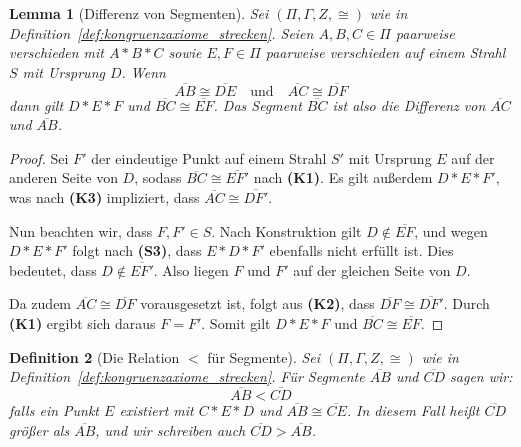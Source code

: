 \documentclass[a4paper,12pt]{article}
\theoremstyle{break}
\newtheorem{definition}{Definition}[section]
\newtheorem{lemma}[definition]{Lemma}
\begin{document}
\begin{lemma}[Differenz von Segmenten]\label{lemma:diff_von_segmenten}
Sei \((\Pi, \Gamma, Z, \cong)\) wie in Definition~\ref{def:kongruenzaxiome_strecken}. Seien \(A, B, C \in \Pi\) paarweise verschieden mit \(A * B * C\) sowie \(E, F \in \Pi\) paarweise verschieden auf einem Strahl \(S\) mit Ursprung \(D\). Wenn 
\[
\overline{AB} \cong \overline{DE} \quad \text{und} \quad \overline{AC} \cong \overline{DF}
\]
dann gilt \(D * E * F\) und \(\overline{BC} \cong \overline{EF}\). Das Segment \(\overline{BC}\) ist also die Differenz von \(\overline{AC}\) und \(\overline{AB}\).
\end{lemma}

\begin{proof}
Sei \(F'\) der eindeutige Punkt auf einem Strahl \(S'\) mit Ursprung \(E\) auf der anderen Seite von \(D\), sodass \(\overline{BC} \cong \overline{EF'}\) nach \textbf{(K1)}. Es gilt außerdem \(D * E * F'\), was nach \textbf{(K3)} impliziert, dass \(\overline{AC} \cong \overline{DF'}\). 

Nun beachten wir, dass \(F, F' \in S\). Nach Konstruktion gilt \(D \notin \overline{EF}\), und wegen \(D * E * F'\) folgt nach \textbf{(S3)}, dass \(E * D * F'\) ebenfalls nicht erfüllt ist. Dies bedeutet, dass \(D \notin \overline{EF'}\). Also liegen \(F\) und \(F'\) auf der gleichen Seite von \(D\). 

Da zudem \(\overline{AC} \cong \overline{DF}\) vorausgesetzt ist, folgt aus \textbf{(K2)}, dass \(\overline{DF} \cong \overline{DF'}\). Durch \textbf{(K1)} ergibt sich daraus \(F = F'\). Somit gilt \(D * E * F\) und \(\overline{BC} \cong \overline{EF}\).
\end{proof}

\begin{definition}[Die Relation \(<\) für Segmente]
Sei \((\Pi, \Gamma, Z, \cong)\) wie in Definition~\ref{def:kongruenzaxiome_strecken}. Für Segmente \(\overline{AB}\) und \(\overline{CD}\) sagen wir: 
\[
\overline{AB} < \overline{CD}
\]
falls ein Punkt \(E\) existiert mit \(C * E * D\) und \(\overline{AB} \cong \overline{CE}\). In diesem Fall heißt \(\overline{CD}\) größer als \(\overline{AB}\), und wir schreiben auch \(\overline{CD} > \overline{AB}\).
\end{definition}
\end{document}
